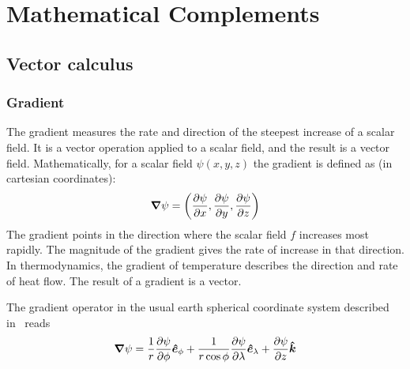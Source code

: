 \appendix
\chapter{Mathematical Complements}\label{ch:appendixA}

\section{Vector calculus}\label{sec:vector-calc}

\subsection{Gradient}\label{subsec:gradient}
The gradient measures the rate and direction of the steepest increase of a scalar field.
It is a vector operation applied to a scalar field, and the result is a vector field.
Mathematically, for a scalar field $\psi(x,y,z)$ the gradient is defined as (in cartesian coordinates):
\begin{equation}
	\bm{\nabla} \psi=\left( \frac{\partial \psi}{\partial x}, \frac{\partial \psi}{\partial y}, \frac{\partial \psi}{\partial z}\right)
	\label{eq:gradient-def}
\end{equation}
The gradient points in the direction where the scalar field $f$ increases most rapidly.
The magnitude of the gradient gives the rate of increase in that direction.
In thermodynamics, the gradient of temperature describes the direction and rate of heat flow.
The result of a gradient is a vector.

The gradient operator in the usual earth spherical coordinate system described in~\secref{\ref{subsec:spherical-coordinate-systems}} reads
\begin{equation}
	\bm{\nabla} \psi = \frac{1}{r} \frac{\partial \psi}{\partial \phi} \bm{\hat{e}}_{\phi} +
	\frac{1}{r \cos \phi} \frac{\partial \psi}{\partial \lambda} \bm{\hat{e}}_{\lambda} +
	\frac{\partial \psi}{\partial z}\bm{\hat{k}}
	\label{eq:gradient-spherical-coords}
\end{equation}

